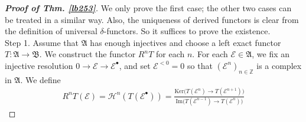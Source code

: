 \documentclass[12pt,b5paper,notitlepage]{report}
\theoremstyle{definition}
\theoremstyle{plain}
\newcommand{\fk}{\mathfrak}
\newcommand{\mc}{\mathcal}
\newcommand{\blt}{\bullet}
\newcommand{\Zbb}{\mathbb Z}
\newcommand{\Ker}{\mathrm{Ker}}
\newcommand{\Imag}{\mathrm{Im}}
\numberwithin{equation}{section}
\begin{document}
\begin{proof}[\textbf{Proof of Thm. \ref{lb253}}]
We only prove the first case; the other two cases can be treated in a similar way. Also, the uniqueness of derived functors is clear from the definition of universal $\delta$-functors. So it suffices to prove the existence.\\

Step 1. Assume that $\fk A$ has enough injectives and choose a left exact functor $T:\fk A\rightarrow\fk B$. We construct the functor $R^nT$ for each $n$. For each $\mc E\in\fk A$, we fix an injective resolution $0\rightarrow\mc E\rightarrow\mc E^\blt$, and set $\mc E^{<0}=0$ so that $(\mc E^n)_{n\in\Zbb}$ is a complex in $\fk A$.  We define
\begin{align}
R^nT(\mc E)=\mc H^n(T(\mc E^\blt))=\frac{\Ker\big(T(\mc E^n)\rightarrow T(\mc E^{n+1})\big)}{\Imag\big(T(\mc E^{n-1})\rightarrow T(\mc E^n)\big)} 
\end{align}


\end{proof}
\end{document}

